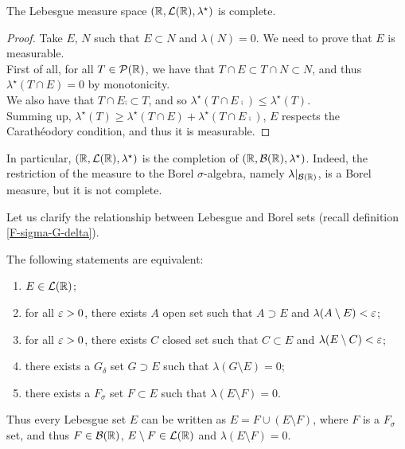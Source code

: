 \begin{prop}
	The Lebesgue measure space $(\mathbb R,\mathcal L(\mathbb R),\lambda^\star)$ is complete.
\end{prop}
\begin{proof}
	Take $E$, $N$ such that $E \subset N$ and $\lambda(N)=0$. We need to prove that $E$ is measurable.\\
	First of all, for all $T \in \mathcal P(\mathbb R)$, we have that $T\cap E \subset T\cap N \subset N$, and thus $\lambda^\star(T\cap E)=0$ by monotonicity. \\
	We also have that $T\cap E\comp \subset T$, and so $\lambda^\star(T\cap E\comp)\leq \lambda^\star(T)$.\\
	Summing up, $\lambda^\star(T)\geq \lambda^\star(T\cap E) + \lambda^\star(T\cap E\comp)$, $E$ respects the Carathéodory condition, and thus it is measurable.
\end{proof}
In particular, $(\mathbb R,\mathcal L(\mathbb R),\lambda^\star)$ is the completion of $(\mathbb R,\mathcal B(\mathbb R),\lambda^\star)$.
Indeed, the restriction of the measure to the Borel $\sigma$-algebra, namely $\lambda|_{\mathcal B(\mathbb R)}$, is a Borel measure, but it is not complete.

Let us clarify the relationship between Lebesgue and Borel sets (recall definition \vref{F-sigma-G-delta}).

\begin{prop}
	The following statements are equivalent:
	\begin{enumerate}
		\item $E \in \mathcal L(\mathbb R)$;
		\item for all $\varepsilon>0$, there exists $A$ open set such that $A\supset E$ and $\lambda(A \setminus E)<\varepsilon$;
		\item for all $\varepsilon>0$, there exists $C$ closed set such that $C\subset E$ and $\lambda(E \setminus C)<\varepsilon$;
		\item there exists a $G_\delta$ set $G \supset E$ such that $\lambda(G \setminus E)=0$;
		\item there exists a $F_\sigma$ set $F \subset E$ such that $\lambda(E \setminus F)=0$. 
	\end{enumerate} 
\end{prop}

Thus every Lebesgue set $E$ can be written as $E=F\cup(E \setminus F)$, where $F$ is a $F_\sigma$ set, and thus $F \in \mathcal B(\mathbb R)$, $E \setminus F \in \mathcal L(\mathbb R)$ and $\lambda(E \setminus F) = 0$.

